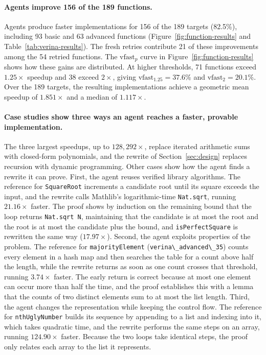 \documentclass{article}
\newcommand{\code}[1]{\lstinline|#1|}
\begin{document}
\paragraph{Agents improve 156 of the 189 functions.}
Agents produce faster implementations for 156 of the 189 targets (82.5\%), including 93 basic and 63 advanced functions (Figure~\ref{fig:function-results} and Table~\ref{tab:verina-results}).
The fresh retries contribute 21 of these improvements among the 54 retried functions.
The $\mathrm{vfast}_p$ curve in Figure~\ref{fig:function-results} shows how these gains are distributed.
At higher thresholds, 71 functions exceed $1.25\times$ speedup and 38 exceed $2\times$, giving $\mathrm{vfast}_{1.25}=37.6\%$ and $\mathrm{vfast}_2=20.1\%$.
Over the 189 targets, the resulting implementations achieve a geometric mean speedup of $1.851\times$ and a median of $1.117\times$.

\paragraph{Case studies show three ways an agent reaches a faster, provable implementation.}
The three largest speedups, up to $128{,}292\times$, replace iterated arithmetic sums with closed-form polynomials, and the rewrite of Section~\ref{sec:design} replaces recursion with dynamic programming.
Other cases show how the agent finds a rewrite it can prove.
First, the agent reuses verified library algorithms.
The reference for \code{SquareRoot} increments a candidate root until its square exceeds the input, and the rewrite calls Mathlib's logarithmic-time \code{Nat.sqrt}, running $21.16\times$ faster.
The proof shows by induction on the remaining bound that the loop returns \code{Nat.sqrt N}, maintaining that the candidate is at most the root and the root is at most the candidate plus the bound, and \code{isPerfectSquare} is rewritten the same way ($17.97\times$).
Second, the agent exploits properties of the problem.
The reference for \code{majorityElement} (\code{verina\_advanced\_35}) counts every element in a hash map and then searches the table for a count above half the length, while the rewrite returns as soon as one count crosses that threshold, running $3.74\times$ faster.
The early return is correct because at most one element can occur more than half the time, and the proof establishes this with a lemma that the counts of two distinct elements sum to at most the list length.
Third, the agent changes the representation while keeping the control flow.
The reference for \code{nthUglyNumber} builds its sequence by appending to a list and indexing into it, which takes quadratic time, and the rewrite performs the same steps on an array, running $124.90\times$ faster.
Because the two loops take identical steps, the proof only relates each array to the list it represents.
\end{document}
